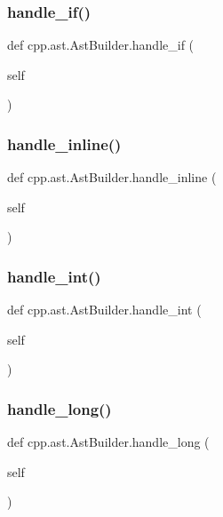 \subsubsection{\texorpdfstring{handle\_if()}{handle\_if()}}
{\footnotesize\ttfamily def cpp.\+ast.\+Ast\+Builder.\+handle\+\_\+if (\begin{DoxyParamCaption}\item[{}]{self }\end{DoxyParamCaption})}

\mbox{\label{classcpp_1_1ast_1_1_ast_builder_ab2eb0c18c07584ef246a46865a17ec40}} 
\subsubsection{\texorpdfstring{handle\_inline()}{handle\_inline()}}
{\footnotesize\ttfamily def cpp.\+ast.\+Ast\+Builder.\+handle\+\_\+inline (\begin{DoxyParamCaption}\item[{}]{self }\end{DoxyParamCaption})}

\mbox{\label{classcpp_1_1ast_1_1_ast_builder_a6f824335dd53e12a76d6f91ab69c627c}} 
\subsubsection{\texorpdfstring{handle\_int()}{handle\_int()}}
{\footnotesize\ttfamily def cpp.\+ast.\+Ast\+Builder.\+handle\+\_\+int (\begin{DoxyParamCaption}\item[{}]{self }\end{DoxyParamCaption})}

\mbox{\label{classcpp_1_1ast_1_1_ast_builder_a08f56b25e6bed18aa955f8cad462d2f9}} 
\subsubsection{\texorpdfstring{handle\_long()}{handle\_long()}}
{\footnotesize\ttfamily def cpp.\+ast.\+Ast\+Builder.\+handle\+\_\+long (\begin{DoxyParamCaption}\item[{}]{self }\end{DoxyParamCaption})}

